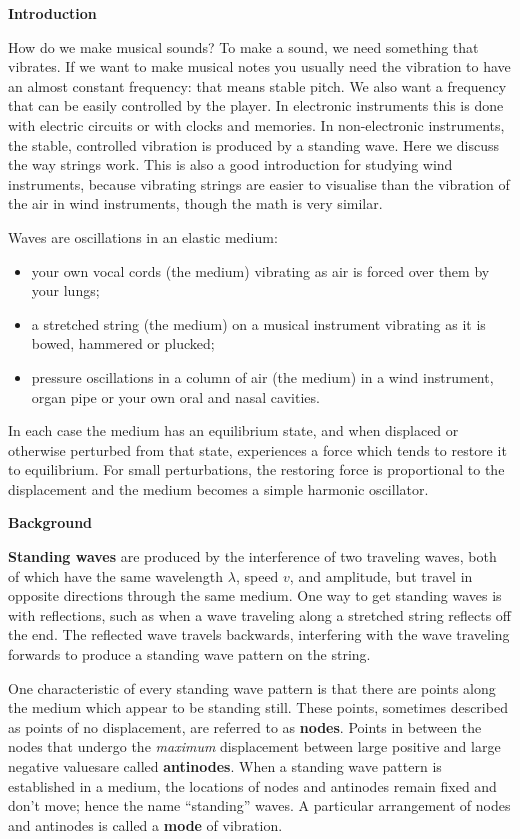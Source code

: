 \textbf{Introduction}

How do we make musical sounds? To make a sound, we need something that vibrates. If we want to make musical notes you usually need the vibration to
have an almost constant frequency: that means stable pitch. We also want a frequency that can be easily controlled by the player. In electronic
instruments this is done with electric circuits or with clocks and memories. In non-electronic instruments, the stable, controlled vibration is
produced by a standing wave. Here we discuss the way strings work. This is also a good introduction for studying wind instruments, because vibrating
strings are easier to visualise than the vibration of the air in wind instruments, though the math is very similar.

Waves are oscillations in an elastic medium:
\begin{itemize}
\item  your own vocal cords (the medium) vibrating as air is forced over them by your lungs; 
\item  a stretched string (the medium) on a musical instrument vibrating as it is bowed, hammered or plucked; 
\item  pressure oscillations in a column of air (the medium) in a wind instrument, organ pipe or your own oral and nasal cavities.
\end{itemize}

In each case the medium has an equilibrium state, and when displaced or otherwise perturbed from that state, experiences a force which tends to
restore it to equilibrium. For small perturbations, the restoring force is proportional to the displacement and the medium becomes a simple harmonic
oscillator.


\textbf{Background}

\textbf{Standing waves} are produced by the interference of two traveling waves, both of which have the
same wavelength $\lambda$, speed $v$, and amplitude, but travel in opposite directions through the same medium. 
One way to get standing waves is with reflections, such as when a wave traveling along a stretched string reflects off the end.  The reflected wave travels backwards, interfering with the wave traveling forwards to produce a standing wave pattern on the string.  

One characteristic of every standing wave pattern is that there are points along the medium which appear to be standing still. These points,
sometimes described as points of no displacement, are referred to as \textbf{nodes}. Points in between the nodes that undergo the \textit{maximum} displacement between
large positive and large negative valuesare called \textbf{antinodes}. When a standing wave pattern is established in a medium, the locations of nodes and antinodes remain fixed and don't move; hence the name ``standing'' waves.  A particular arrangement of nodes and antinodes is called a \textbf{mode} of vibration.

